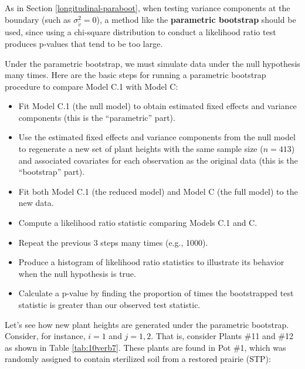 \documentclass[
]{krantz}
\providecommand{\tightlist}{%
  \setlength{\itemsep}{0pt}\setlength{\parskip}{0pt}}
\begin{document}
As in Section \ref{longitudinal-paraboot}, when testing variance components at the boundary (such as \(\sigma_{\tilde{v}}^{2} = 0\)), a method like the \textbf{parametric bootstrap}  should be used, since using a chi-square distribution to conduct a likelihood ratio test produces p-values that tend to be too large.

Under the parametric bootstrap, we must simulate data under the null hypothesis many times. Here are the basic steps for running a parametric bootstrap procedure to compare Model C.1 with Model C:

\begin{itemize}
\tightlist
\item
  Fit Model C.1 (the null model) to obtain estimated fixed effects and variance components (this is the ``parametric'' part).
\item
  Use the estimated fixed effects and variance components from the null model to regenerate a new set of plant heights with the same sample size (\(n=413\)) and associated covariates for each observation as the original data (this is the ``bootstrap'' part).
\item
  Fit both Model C.1 (the reduced model) and Model C (the full model) to the new data.
\item
  Compute a likelihood ratio statistic comparing Models C.1 and C.
\item
  Repeat the previous 3 steps many times (e.g., 1000).
\item
  Produce a histogram of likelihood ratio statistics to illustrate its behavior when the null hypothesis is true.
\item
  Calculate a p-value by finding the proportion of times the bootstrapped test statistic is greater than our observed test statistic.
\end{itemize}

Let's see how new plant heights are generated under the parametric bootstrap. Consider, for instance, \(i=1\) and \(j=1,2\). That is, consider Plants \#11 and \#12 as shown in Table \ref{tab:10verb7}. These plants are found in Pot \#1, which was randomly assigned to contain sterilized soil from a restored prairie (STP):

\begin{table}
\centering
\caption{\label{tab:10verb7}Original data for Plants 11 and 12 from Pot 1.}
\centering
{}
\end{table}
\end{document}
